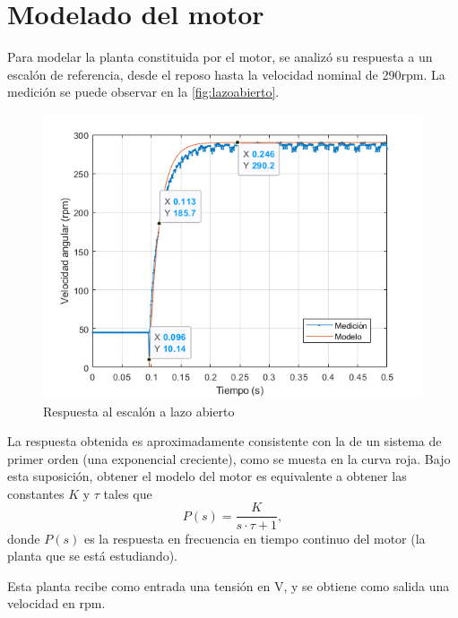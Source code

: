 \documentclass{article}
\begin{document}



\section{Modelado del motor}

Para modelar la planta constituida por el motor, se analiz\'o su respuesta a un escal\'on de referencia, desde el reposo hasta la velocidad nominal de 290rpm. La medici\'on se puede observar en la \autoref{fig:lazoabierto}.

\begin{figure}[ht]
	\centering
	\includegraphics[scale=0.75]{imgs/lazoabierto.png}
	\caption{Respuesta al escal\'on a lazo abierto}
	\label{fig:lazoabierto}
\end{figure}

La respuesta obtenida es aproximadamente consistente con la de un sistema de primer orden (una exponencial creciente), como se muesta en la curva roja. Bajo esta suposici\'on, obtener el modelo del motor es equivalente a obtener las constantes $K$ y $\tau$ tales que
\begin{equation}
	P(s) = \frac{K}{s\cdot\tau+1},
\end{equation} 
donde $P(s)$ es la respuesta en frecuencia en tiempo continuo del motor (la planta que se est\'a estudiando).

Esta planta recibe como entrada una tensi\'on en V, y se obtiene como salida una velocidad en rpm.
\end{document}
